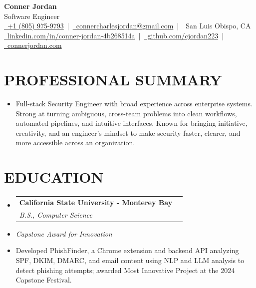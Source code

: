 \documentclass[letterpaper,10pt]{article}
\makeatletter
\newcommand{\resumeSubHeadingListStart}{\begin{itemize}[leftmargin=0in,label={}]}
\newcommand{\resumeSubHeadingListEnd}{\end{itemize}}
\newcommand{\resumeSubheading}[4]{%
  \vspace{-2pt}\item
  \begin{tabular*}{\textwidth}[t]{l@{\extracolsep{\fill}}r}
    \textbf{\large #1} & \textbf{\small #2} \\
    \textit{\large #3} & \textit{\small #4} \\
  \end{tabular*}\vspace{-2pt}
}
\makeatother
\begin{document}
\begin{center}
  {\Huge \textbf{Conner Jordan}}\\[0pt]
  {\Large Software Engineer}\\[0pt]
  \href{tel:+18059759793}{\faPhone\ +1 (805) 975-9793} \,|\,
  \href{mailto:connercharlesjordan@gmail.com}{\faEnvelope\ connercharlesjordan@gmail.com} \,|\,
  \faMapMarker\ San Luis Obispo, CA \\[-2pt]
  \href{https://www.linkedin.com/in/conner-jordan-4b268514a/}{\faLinkedin\ linkedin.com/in/conner-jordan-4b268514a}
  \,|\, \href{https://github.com/cjordan223}{\faGithub\ github.com/cjordan223}
  \,|\, \href{https://connerjordan.com/}{\faGlobe\ connerjordan.com}
\end{center}

\vspace{4pt}

\section{PROFESSIONAL SUMMARY}
\vspace{8pt}
\resumeSubHeadingListStart
\item {\small
Full-stack Security Engineer with broad experience across enterprise systems. Strong at turning ambiguous, cross-team problems into clean workflows, automated pipelines, and intuitive interfaces. Known for bringing initiative, creativity, and an engineer's mindset to make security faster, clearer, and more accessible across an organization.
}
\resumeSubHeadingListEnd
\vspace{6pt}

\section{EDUCATION}
\vspace{8pt}
\resumeSubHeadingListStart
  \resumeSubheading
    {California State University - Monterey Bay}{}
    {B.S., Computer Science}{}
  \item {\small \textit{Capstone Award for Innovation }}
  \item {\small Developed PhishFinder, a Chrome extension and backend API analyzing SPF, DKIM, DMARC, and email content using NLP and LLM analysis to detect phishing attempts; awarded Most Innovative Project at the 2024 Capstone Festival.}
\resumeSubHeadingListEnd
\vspace{6pt}
\end{document}
